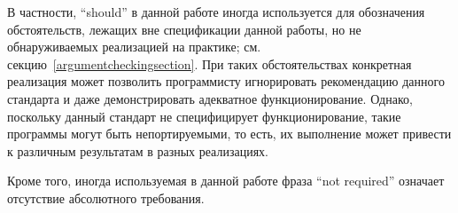 В частности, ``should'' в данной работе иногда используется для обозначения обстоятельств,
лежащих вне спецификации данной работы, но не обнаруживаемых реализацией на практике;
см. секцию~\ref{argumentcheckingsection}. При таких обстоятельствах конкретная реализация может
позволить программисту игнорировать рекомендацию данного стандарта и даже демонстрировать
адекватное функционирование. Однако, поскольку данный стандарт не специфицирует функционирование,
такие программы могут быть непортируемыми, то есть, их выполнение может привести к различным
результатам в разных реализациях.


Кроме того, иногда используемая в данной работе фраза ``not required'' означает отсутствие
абсолютного требования.

